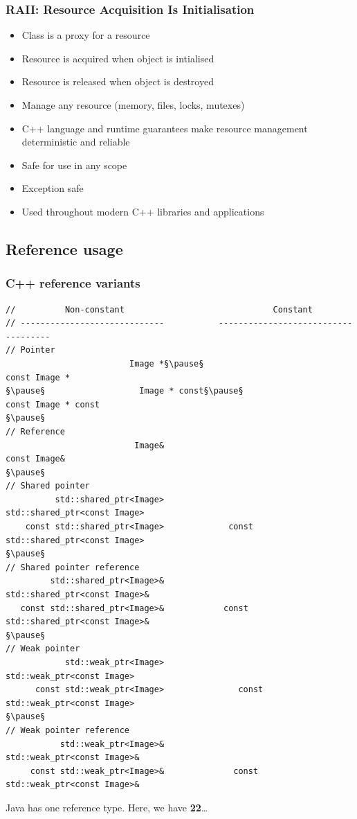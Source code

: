 \documentclass[handout]{beamer}
\begin{document}
\begin{frame}[fragile]
  \frametitle{RAII: Resource Acquisition Is Initialisation}
    \begin{itemize}
      \pause
    \item Class is a proxy for a resource
      \pause
    \item Resource is acquired when object is intialised
    \item Resource is released when object is destroyed
      \pause
    \item Manage any resource (memory, files, locks, mutexes)
      \pause
    \item C++ language and runtime guarantees make resource management
      deterministic and reliable
      \pause
    \item Safe for use in any scope
      \pause
    \item Exception safe
      \pause
    \item Used throughout modern C++ libraries and applications
    \end{itemize}
\end{frame}

\subsection{Reference usage}
\begin{frame}[fragile]
  \frametitle{C++ reference variants}
  \begin{lstlisting}[basicstyle=\tiny\ttfamily,frame=none]
//          Non-constant                              Constant
// -----------------------------           ------------------------------------
// Pointer
                         Image *§\pause§                                  const Image *
§\pause§                   Image * const§\pause§                            const Image * const
§\pause§
// Reference
                          Image&                                   const Image&
§\pause§
// Shared pointer
          std::shared_ptr<Image>                   std::shared_ptr<const Image>
    const std::shared_ptr<Image>             const std::shared_ptr<const Image>
§\pause§
// Shared pointer reference
         std::shared_ptr<Image>&                  std::shared_ptr<const Image>&
   const std::shared_ptr<Image>&            const std::shared_ptr<const Image>&
§\pause§
// Weak pointer
            std::weak_ptr<Image>                     std::weak_ptr<const Image>
      const std::weak_ptr<Image>               const std::weak_ptr<const Image>
§\pause§
// Weak pointer reference
           std::weak_ptr<Image>&                    std::weak_ptr<const Image>&
     const std::weak_ptr<Image>&              const std::weak_ptr<const Image>&
\end{lstlisting}
\pause
\begin{center}
  Java has one reference type.  Here, we have \textbf{22}…
\end{center}
\end{frame}
\end{document}
